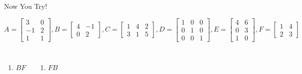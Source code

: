 \documentclass[xcoler=dvipsnames, aspectratio=169]{beamer}
\begin{document}
    \begin{frame}{Now You Try!}

        {\scriptsize
        \[
            A=\begin{bmatrix}3&0\\-1&2\\1&1\end{bmatrix}, B=\begin{bmatrix}4&-1\\0&2\end{bmatrix},
            C=\begin{bmatrix}1&4&2\\3&1&5\end{bmatrix}, D = \begin{bmatrix}1&0&0\\0&1&0\\0&0&1\end{bmatrix},
            E=\begin{bmatrix}4&6\\0&3\\1&0\end{bmatrix}, F=\begin{bmatrix}1&4\\2&3\end{bmatrix}
        \]}
        \begin{columns}
            \begin{enumerate}
                \item $BF$
                    \iftoggle{showSolutions}{
                        \only<2->{
                            \[
                                BF = \begin{bmatrix}
                                    2&13\\
                                    4&6
                                \end{bmatrix}
                            \]
                        }
                    }{}
            \end{enumerate}
            \begin{enumerate}
                \addtocounter{enumi}{1}
                \item $FB$
                    \iftoggle{showSolutions}{
                        \only<3->{
                            \[
                                FB = \begin{bmatrix}
                                    4&7\\
                                    8&4
                                \end{bmatrix}
                            \]
                        }
                    }{}
            \end{enumerate}
        \end{columns}
        \vspace{120pt}
    \end{frame}
\end{document}
